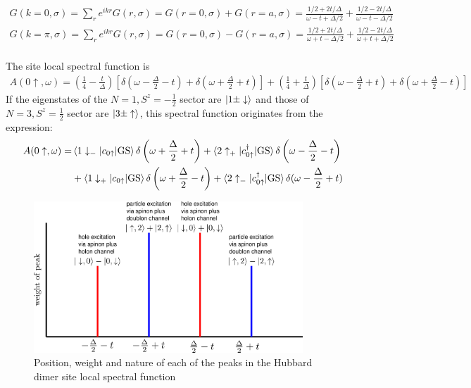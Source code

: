 \documentclass[prb]{revtex4-2}
\begin{document}
\begin{equation}\begin{aligned}
	\label{Gk0}
	G(k=0, \sigma) = \sum_r e^{ikr} G(r, \sigma) = G(r=0, \sigma) + G(r=a, \sigma) = \frac{1/2 + 2t/\Delta}{\omega -t + \Delta/2} + \frac{1/2 - 2t/\Delta}{\omega - t - \Delta/2}\\
	G(k=\pi, \sigma) = \sum_r e^{ikr} G(r, \sigma) = G(r=0, \sigma) - G(r=a, \sigma) = \frac{1/2 + 2t/\Delta}{\omega + t - \Delta/2} + \frac{1/2 - 2t/\Delta}{\omega + t + \Delta/2}\\
\end{aligned}\end{equation}

The site local spectral function is
\begin{equation}\begin{aligned}
	A(0\uparrow, \omega) = \left( \frac{1}{4} - \frac{t}{\Delta} \right)\left[\delta(\omega - \frac{\Delta}{2} - t) + \delta(\omega + \frac{\Delta}{2} + t)\right]\nonumber + \left( \frac{1}{4} + \frac{t}{\Delta} \right) \left[\delta(\omega - \frac{\Delta}{2} + t) + \delta(\omega + \frac{\Delta}{2} - t)\right]
\end{aligned}\end{equation}
If the eigenstates of the $N=1, S^z = - \frac{1}{2}$ sector are $\ket{1 \pm \downarrow}$ and those of $N=3, S^z = \frac{1}{2}$ sector are $\ket{3 \pm \uparrow}$, this spectral function originates from the expression:
\begin{equation}\begin{aligned}
	A(0\uparrow, \omega) =& \braket{1 \downarrow_- | c_{0 \uparrow} | \text{GS}} \delta\left(\omega + \frac{\Delta}{2} + t\right) + \braket{2 \uparrow_+ | c^\dagger_{0 \uparrow} | \text{GS}}\delta\left(\omega - \frac{\Delta}{2} - t\right) \\
			      &+ \braket{1 \downarrow_+ | c_{0 \uparrow} | \text{GS}}\delta\left(\omega + \frac{\Delta}{2} - t\right) + \braket{2 \uparrow_- | c^\dagger_{0 \uparrow} | \text{GS}}\delta(\omega - \frac{\Delta}{2} + t)
\end{aligned}\end{equation}
\begin{figure}[!htb]
	\centering
	\includegraphics[width=0.9\textwidth]{dimer-peaks.png}
	\caption{Position, weight and nature of each of the peaks in the Hubbard dimer site local spectral function}
\end{figure}
\end{document}
